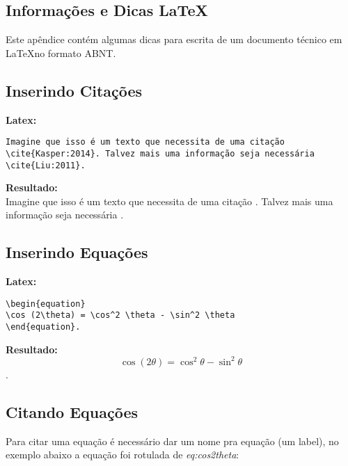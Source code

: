 \begin{apendicesenv}


\chapter{Informações e Dicas \LaTeX}

Este apêndice contém algumas dicas para escrita de um documento técnico em \LaTeX no formato ABNT.

\section{Inserindo Citações}

\textbf{Latex:}
\begin{verbatim}
Imagine que isso é um texto que necessita de uma citação
\cite{Kasper:2014}. Talvez mais uma informação seja necessária
\cite{Liu:2011}.
\end{verbatim}

\textbf{Resultado:}\\
Imagine que isso é um texto que necessita de uma citação \cite{Kasper:2014}. Talvez mais uma informação seja necessária \cite{Liu:2011}.

\section{Inserindo Equações}

\textbf{Latex:}
\begin{verbatim}
\begin{equation}
\cos (2\theta) = \cos^2 \theta - \sin^2 \theta
\end{equation}.
\end{verbatim}

\textbf{Resultado:}\\
\begin{equation}
\cos (2\theta) = \cos^2 \theta - \sin^2 \theta
\end{equation}.
\newpage
\section{Citando Equações}

Para citar uma equação é necessário dar um nome pra equação (um label), no exemplo abaixo a equação foi rotulada de \textit{eq:cos2theta}:


\end{apendicesenv}

